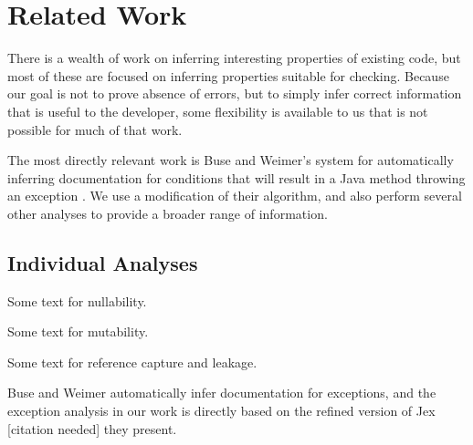 \section{Related Work}
There is a wealth of work on inferring interesting properties of existing code,
but most of these are focused on inferring properties suitable for checking.
Because our goal is not to prove absence of errors, but to simply infer correct
information that is useful to the developer, some flexibility is available to us
that is not possible for much of that work.

The most directly relevant work is Buse and Weimer's system for automatically
inferring documentation for conditions that will result in a Java method
throwing an exception \cite{autodoc}.  We use a modification of their
algorithm, and also perform several other analyses to provide a broader range
of information.

\subsection{Individual Analyses}
Some text for nullability.

Some text for mutability.

Some text for reference capture and leakage.

Buse and Weimer \cite{autodoc} automatically infer documentation for
exceptions, and the exception analysis in our work is directly based on the
refined version of {\sc Jex} [citation needed] they present.
